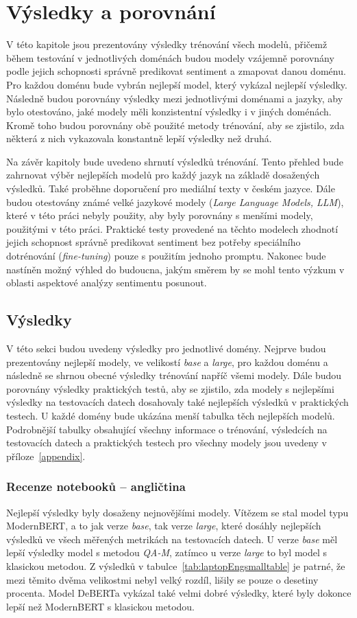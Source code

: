 \chapter{Výsledky a porovnání}\label{Results}
V této kapitole jsou prezentovány výsledky trénování všech modelů, přičemž během testování v jednotlivých doménách budou modely vzájemně porovnány podle jejich schopnosti správně predikovat sentiment a zmapovat danou doménu. Pro každou doménu bude vybrán nejlepší model, který vykázal nejlepší výsledky. Následně budou porovnány výsledky mezi jednotlivými doménami a jazyky, aby bylo otestováno, jaké modely měli konzistentní výsledky i v jiných doménách. Kromě toho budou porovnány obě použité metody trénování, aby se zjistilo, zda některá z nich vykazovala konstantně lepší výsledky než druhá.

Na závěr kapitoly bude uvedeno shrnutí výsledků trénování. Tento přehled bude zahrnovat výběr nejlepších modelů pro každý jazyk na základě dosažených výsledků. Také proběhne doporučení pro mediální texty v českém jazyce. Dále budou otestovány známé velké jazykové modely (\emph{Large Language Models, LLM}), které v této práci nebyly použity, aby byly porovnány s menšími modely, použitými v této práci. Praktické testy provedené na těchto modelech zhodnotí jejich schopnost správně predikovat sentiment bez potřeby speciálního dotrénování (\emph{fine-tuning}) pouze s použitím jednoho promptu. Nakonec bude nastíněn možný výhled do budoucna, jakým směrem by se mohl tento výzkum v oblasti aspektové analýzy sentimentu posunout.

\section{Výsledky}
V této sekci budou uvedeny výsledky pro jednotlivé domény. Nejprve budou prezentovány nejlepší modely, ve velikostí \emph{base} a \emph{large}, pro každou doménu a následně se shrnou obecné výsledky trénování napříč všemi modely. Dále budou porovnány výsledky praktických testů, aby se zjistilo, zda modely s nejlepšími výsledky na testovacích datech dosahovaly také nejlepších výsledků v praktických testech. U každé domény bude ukázána menší tabulka těch nejlepších modelů. Podrobnější tabulky obsahující všechny informace o trénování, výsledcích na testovacích datech a praktických testech pro všechny modely jsou uvedeny v příloze~\ref{appendix}.

\subsection{Recenze notebooků -- angličtina}
Nejlepší výsledky byly dosaženy nejnovějšími modely. Vítězem se stal model typu ModernBERT, a to jak verze \emph{base}, tak verze \emph{large}, které dosáhly nejlepších výsledků ve všech měřených metrikách na testovacích datech. U verze \emph{base} měl lepší výsledky model s metodou \emph{QA-M}, zatímco u verze \emph{large} to byl model s klasickou metodou. Z výsledků v tabulce~\ref{tab:laptopEngsmalltable} je patrné, že mezi těmito dvěma velikostmi nebyl velký rozdíl, lišily se pouze o desetiny procenta. Model DeBERTa vykázal také velmi dobré výsledky, které byly dokonce lepší než ModernBERT s klasickou metodou.

